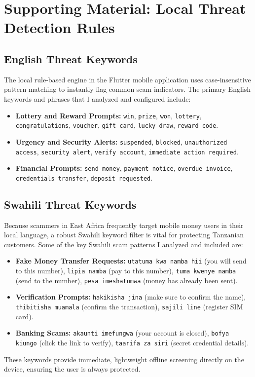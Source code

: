 \chapter{Supporting Material: Local Threat Detection Rules}
\label{app:supporting-evidence}

\section{English Threat Keywords}
The local rule-based engine in the Flutter mobile application uses case-insensitive pattern matching to instantly flag common scam indicators. The primary English keywords and phrases that I analyzed and configured include:
\begin{itemize}
  \item \textbf{Lottery and Reward Prompts:} \texttt{win}, \texttt{prize}, \texttt{won}, \texttt{lottery}, \texttt{congratulations}, \texttt{voucher}, \texttt{gift card}, \texttt{lucky draw}, \texttt{reward code}.
  \item \textbf{Urgency and Security Alerts:} \texttt{suspended}, \texttt{blocked}, \texttt{unauthorized access}, \texttt{security alert}, \texttt{verify account}, \texttt{immediate action required}.
  \item \textbf{Financial Prompts:} \texttt{send money}, \texttt{payment notice}, \texttt{overdue invoice}, \texttt{credentials transfer}, \texttt{deposit requested}.
\end{itemize}

\section{Swahili Threat Keywords}
Because scammers in East Africa frequently target mobile money users in their local language, a robust Swahili keyword filter is vital for protecting Tanzanian customers. Some of the key Swahili scam patterns I analyzed and included are:
\begin{itemize}
  \item \textbf{Fake Money Transfer Requests:} \texttt{utatuma kwa namba hii} (you will send to this number), \texttt{lipia namba} (pay to this number), \texttt{tuma kwenye namba} (send to the number), \texttt{pesa imeshatumwa} (money has already been sent).
  \item \textbf{Verification Prompts:} \texttt{hakikisha jina} (make sure to confirm the name), \texttt{thibitisha muamala} (confirm the transaction), \texttt{sajili line} (register SIM card).
  \item \textbf{Banking Scams:} \texttt{akaunti imefungwa} (your account is closed), \texttt{bofya kiungo} (click the link to verify), \texttt{taarifa za siri} (secret credential details).
\end{itemize}
These keywords provide immediate, lightweight offline screening directly on the device, ensuring the user is always protected.
